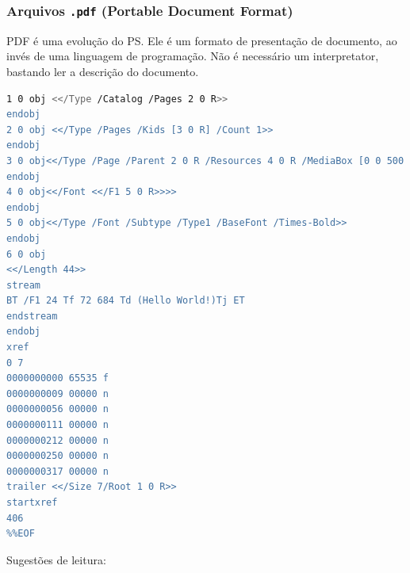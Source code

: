 \begin{frame}
\frametitle{Arquivos \texttt{.pdf} (Portable Document Format)}
PDF é uma evolução do PS. Ele é um formato de presentação de documento, ao invés de uma linguagem de programação.
Não é necessário um interpretator, bastando ler a descrição do documento.

\begin{lstlisting}[language=bash, label=lst-pdf, caption={Exemplo `Hello World!'.}, postbreak=\mbox{$\hookrightarrow$\space}, basicstyle=\fontsize{7}{9}\selectfont\ttfamily]
%PDF-1.4
1 0 obj <</Type /Catalog /Pages 2 0 R>>
endobj
2 0 obj <</Type /Pages /Kids [3 0 R] /Count 1>>
endobj
3 0 obj<</Type /Page /Parent 2 0 R /Resources 4 0 R /MediaBox [0 0 500 800] /Contents 6 0 R>>
endobj
4 0 obj<</Font <</F1 5 0 R>>>>
endobj
5 0 obj<</Type /Font /Subtype /Type1 /BaseFont /Times-Bold>>
endobj
6 0 obj
<</Length 44>>
stream
BT /F1 24 Tf 72 684 Td (Hello World!)Tj ET
endstream
endobj
xref
0 7
0000000000 65535 f
0000000009 00000 n
0000000056 00000 n
0000000111 00000 n
0000000212 00000 n
0000000250 00000 n
0000000317 00000 n
trailer <</Size 7/Root 1 0 R>>
startxref
406
%%EOF
\end{lstlisting}

\end{frame}



\begin{frame}
\small
Sugestões de leitura:
\vspace{2ex}



\end{frame}


